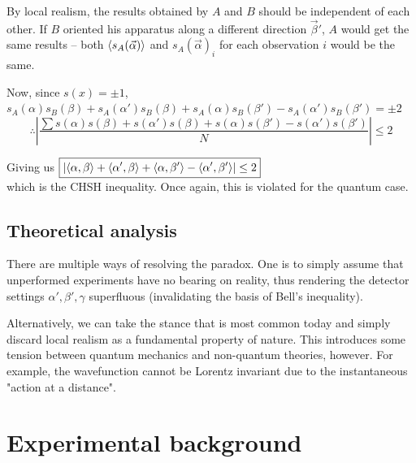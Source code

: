 \documentclass[10pt, twocolumn]{article}
\begin{document}
By local realism, the results obtained by $A$ and $B$ should be independent of each other. If $B$ oriented his apparatus along a different direction $\vec\beta'$, $A$ would get the same results -- both $\Braket{s_A(\vec\alpha)}$ and $s_A(\vec\alpha)_i$ for each observation $i$ would be the same.

Now, since $s(x) = \pm 1$, $s_A(\alpha)s_B(\beta)+ s_A(\alpha')s_B(\beta)+ s_A(\alpha)s_B(\beta')-s_A(\alpha')s_B(\beta')=\pm 2$
$$\therefore \left|\frac{\sum s(\alpha)s(\beta)+ s(\alpha')s(\beta)+ s(\alpha)s(\beta')-s(\alpha')s(\beta')}{N}\right|\leq 2$$

Giving us $ \boxed{\left|\Braket{\alpha,\beta}+\Braket{\alpha',\beta}+\Braket{\alpha,\beta'}-\Braket{\alpha',\beta'}\right|\leq 2}$\\ which is the CHSH inequality. Once again, this is violated for the quantum case.

\subsection{Theoretical analysis}

There are multiple ways of resolving the paradox. One is to simply assume that unperformed experiments have no bearing on reality, thus rendering the detector settings $\alpha',\beta',\gamma$ superfluous (invalidating the basis of Bell's inequality).

Alternatively, we can take the stance that is most common today and simply discard local realism as a fundamental property of nature. This introduces some tension between quantum mechanics and non-quantum theories, however. For example, the wavefunction cannot be Lorentz invariant due to the instantaneous "action at a distance".
\section{Experimental background}
\end{document}
